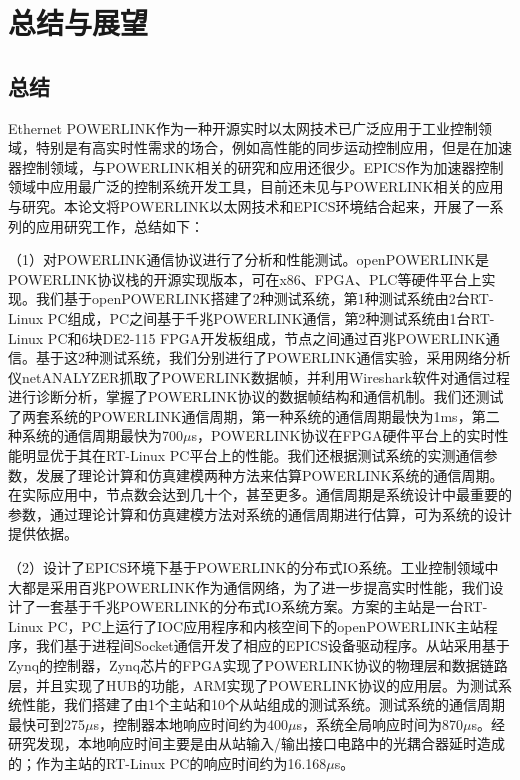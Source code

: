 
\chapter{总结与展望}

\section{总结}
Ethernet POWERLINK作为一种开源实时以太网技术已广泛应用于工业控制领域，特别是有高实时性需求的场合，例如高性能的同步运动控制应用，但是在加速器控制领域，与POWERLINK相关的研究和应用还很少。EPICS作为加速器控制领域中应用最广泛的控制系统开发工具，目前还未见与POWERLINK相关的应用与研究。本论文将POWERLINK以太网技术和EPICS环境结合起来，开展了一系列的应用研究工作，总结如下：

（1）对POWERLINK通信协议进行了分析和性能测试。openPOWERLINK是POWERLINK协议栈的开源实现版本，可在x86、FPGA、PLC等硬件平台上实现。我们基于openPOWERLINK搭建了2种测试系统，第1种测试系统由2台RT-Linux PC组成，PC之间基于千兆POWERLINK通信，第2种测试系统由1台RT-Linux PC和6块DE2-115 FPGA开发板组成，节点之间通过百兆POWERLINK通信。基于这2种测试系统，我们分别进行了POWERLINK通信实验，采用网络分析仪netANALYZER抓取了POWERLINK数据帧，并利用Wireshark软件对通信过程进行诊断分析，掌握了POWERLINK协议的数据帧结构和通信机制。我们还测试了两套系统的POWERLINK通信周期，第一种系统的通信周期最快为1ms，第二种系统的通信周期最快为700$\mu$s，POWERLINK协议在FPGA硬件平台上的实时性能明显优于其在RT-Linux PC平台上的性能。我们还根据测试系统的实测通信参数，发展了理论计算和仿真建模两种方法来估算POWERLINK系统的通信周期。在实际应用中，节点数会达到几十个，甚至更多。通信周期是系统设计中最重要的参数，通过理论计算和仿真建模方法对系统的通信周期进行估算，可为系统的设计提供依据。

（2）设计了EPICS环境下基于POWERLINK的分布式IO系统。工业控制领域中大都是采用百兆POWERLINK作为通信网络，为了进一步提高实时性能，我们设计了一套基于千兆POWERLINK的分布式IO系统方案。方案的主站是一台RT-Linux PC，PC上运行了IOC应用程序和内核空间下的openPOWERLINK主站程序，我们基于进程间Socket通信开发了相应的EPICS设备驱动程序。从站采用基于Zynq的控制器，Zynq芯片的FPGA实现了POWERLINK协议的物理层和数据链路层，并且实现了HUB的功能，ARM实现了POWERLINK协议的应用层。为测试系统性能，我们搭建了由1个主站和10个从站组成的测试系统。测试系统的通信周期最快可到275$\mu$s，控制器本地响应时间约为400$\mu$s，系统全局响应时间为870$\mu$s。经研究发现，本地响应时间主要是由从站输入/输出接口电路中的光耦合器延时造成的；作为主站的RT-Linux PC的响应时间约为16.168$\mu$s。

